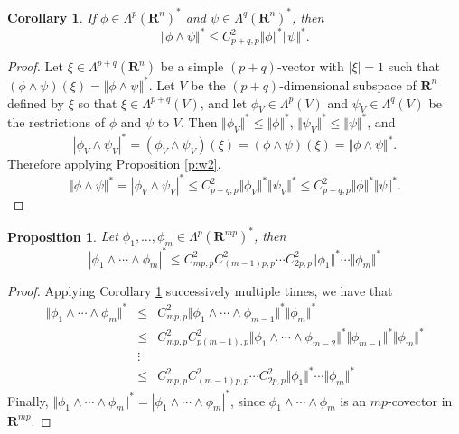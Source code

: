 \documentclass[12pt]{amsart}
\newtheorem{corollary}[theorem]{Corollary}
\newtheorem{proposition}[theorem]{Proposition}
\theoremstyle{definition}
\theoremstyle{remark}
\numberwithin{equation}{section}
\begin{document}
\begin{corollary}\label{c:w2} %
If $\phi \in \Lambda^p(\mathbf{R}^n)^\ast$ and $\psi \in \Lambda^{q}(\mathbf{R}^n)^\ast$, then
\begin{equation*}
\Vert\phi\wedge\psi\Vert^\ast \leq C_{p+q,p}^2 \Vert \phi\Vert^\ast\Vert \psi\Vert^\ast.
\end{equation*}
\end{corollary}
\begin{proof}
Let $\xi \in \Lambda^{p+q}(\mathbf{R}^n)$ be a simple $(p+q)$-vector with  $|\xi|=1$ such that $(\phi\wedge \psi)(\xi) = \Vert \phi\wedge \psi\Vert^\ast$.
Let $V$ be the $(p+q)$-dimensional subspace of $\mathbf{R}^n$ defined by $\xi$ so that $\xi \in \Lambda^{p+q}(V)$, and
let $\phi_V \in \Lambda^p(V)$ and $\psi_V \in \Lambda^q(V)$ be the restrictions of $\phi$ and $\psi$ to $V$. Then $\Vert \phi_V \Vert^\ast \leq \Vert \phi\Vert^\ast$, $\Vert \psi_V \Vert^\ast \leq \Vert \psi\Vert^\ast$, and
\begin{equation*}
|\phi_V\wedge\psi_V|^\ast = (\phi_V \wedge \psi_V)(\xi) = (\phi\wedge \psi)(\xi) = \Vert \phi\wedge \psi\Vert^\ast.
\end{equation*}
Therefore applying Proposition \ref{p:w2}, 
\begin{equation*}
\Vert \phi\wedge \psi\Vert^\ast= |\phi_V\wedge\psi_V|^\ast \leq C_{p+q,p}^2 \Vert \phi_V\Vert^\ast\Vert\psi_V\Vert^\ast \leq C_{p+q,p}^2 \Vert \phi\Vert^\ast\Vert\psi\Vert^\ast.
\end{equation*}
\end{proof}
 


\begin{proposition}\label{p:wm}%
Let $\phi_1, \dots, \phi_m \in \Lambda^p(\mathbf{R}^{mp})^\ast$, then
\begin{equation*}
|\phi_1\wedge\cdots\wedge\phi_m|^\ast \leq C_{mp,p}^2C_{(m-1)p,p}^2 \cdots C_{2p,p}^2 \Vert \phi_1\Vert^\ast \cdots \Vert \phi_m\Vert^\ast
\end{equation*}
\end{proposition}
\begin{proof}
Applying Corollary \ref{c:w2} successively multiple times, we have that
\begin{eqnarray*}
\Vert\phi_1\wedge\cdots\wedge\phi_m\Vert^\ast  &\leq& C_{mp,p}^2 \Vert \phi_1\wedge\cdots\wedge\phi_{m-1}\Vert^\ast\Vert \phi_m\Vert^\ast\\
 &\leq&C_{mp,p}^2 C_{p(m-1),p}^2 \Vert \phi_1\wedge\cdots\wedge\phi_{m-2}\Vert^\ast\Vert \phi_{m-1}\Vert^\ast\Vert \phi_m\Vert^\ast\\
 &\vdots&\\
 &\leq&C_{mp,p}^2C_{(m-1)p,p}^2 \cdots C_{2p,p}^2 \Vert \phi_1\Vert^\ast \cdots \Vert \phi_m\Vert^\ast
\end{eqnarray*}
Finally, $\Vert\phi_1\wedge\cdots\wedge\phi_m\Vert^\ast  = |\phi_1\wedge\cdots\wedge\phi_m|^\ast $, since $\phi_1\wedge\cdots\wedge\phi_m$ is an $mp$-covector in 
$\mathbf{R}^{mp}$. 
\end{proof}
\end{document}
